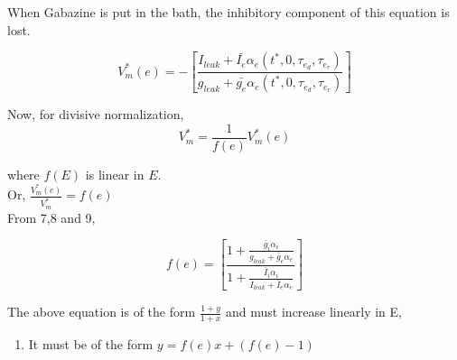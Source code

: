 \documentclass[10pt,a4paper]{article}
\begin{document}
When Gabazine is put in the bath, the inhibitory component of this equation is lost.

\begin{equation}
V^*_m (e) = - \left[ \frac{I_{leak} + \bar{I_e}\alpha_e(t^*,0, \tau_{e_d}, \tau_{e_r})}{g_{leak} + \bar{g_e}\alpha_e(t^*,0, \tau_{e_d}, \tau_{e_r})} \right]
\end{equation}


Now, for divisive normalization,
\begin{equation}
V^*_m =\frac{1}{f(e)} V^*_m (e)
\end{equation}

where $f(E)$ is linear in $E$.\\

Or, $\frac{V^*_m (e)}{V^*_m} = f(e)$ \\

From 7,8 and 9,

\begin{equation}
f(e) = \left[ \frac{1 + \frac{\bar{g}_i \alpha_i}{g_{leak} + \bar{g}_e \alpha_e }}{ 1 + \frac{\bar{I}_i \alpha_i}{I_{leak} + \bar{I}_e \alpha_e }}\right]
\end{equation}




The above equation is of the form $\frac{1+y}{1+x}$ and must increase linearly in E,
\begin{enumerate}
\item It must be of the form $y = f(e)x + (f(e)-1)$
\end{enumerate}
\end{document}
